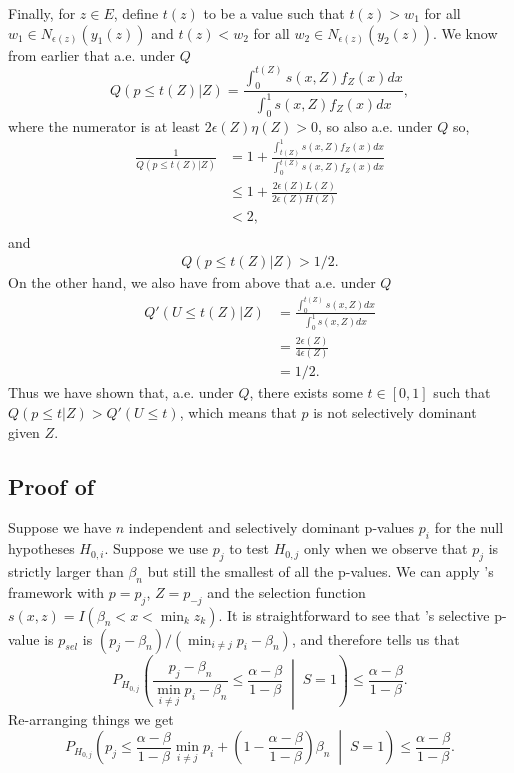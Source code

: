 \documentclass{article}
\begin{document}
\begin{appendix}
Finally, for $z \in E$, define $t(z)$ to be a value such that $t(z) > w_1$ for all $w_1 \in N_{\epsilon(z)}(y_1(z))$ and $t(z) < w_2$ for all $w_2 \in  N_{\epsilon(z)}(y_2(z))$. We know from earlier that a.e. under $Q$ 
\begin{equation*}
    Q(p \leq t(Z) |Z) = \frac{\int_0^{t(Z)} s(x, Z) f_Z(x) dx }{\int_0^1 s(x, Z) f_Z(x) dx},
\end{equation*}
where the numerator is at least $2\epsilon(Z)\eta(Z) >0$, so also a.e. under $Q$
so, 
\begin{align*}
    \frac{1}{Q(p \leq t(Z) |Z)} &= 1 + \frac{\int_{t(Z)}^1 s(x, Z) f_Z(x) dx }{\int_0^{t(Z)} s(x, Z) f_Z(x) dx}\\
                                &\leq 1 + \frac{2 \epsilon(Z) L(Z)}{2 \epsilon(Z)H(Z)}\\
                                &< 2, \\
\end{align*}
and 
\begin{align*}
    Q(p \leq t(Z) |Z) > 1/2.
\end{align*}
On the other hand, we also have from above that a.e. under $Q$ 
\begin{align*}
    Q'(U \leq t(Z) |Z) &= \frac{\int_0^{t(Z)} s(x, Z) dx }{\int_0^1 s(x, Z) dx}\\
                       &= \frac{2\epsilon(Z)}{4 \epsilon(Z)}\\
                       &= 1/2.
\end{align*}
Thus we have shown that, a.e. under $Q$, there exists some $t \in [0, 1]$ such that $Q(p \leq t | Z) > Q'(U \leq t)$, which means that $p$ is not selectively dominant given $Z$.  


\subsection{Proof of }
\label{sec:hyb_proof_appdx}

Suppose we have $n$ independent and selectively dominant p-values $p_i$ for the null hypotheses $H_{0, i}$. Suppose we use $p_j$ to test $H_{0, j}$ only when we observe that $p_j$ is strictly larger than $\beta_n$ but still the smallest of all the p-values. We can apply 's framework with $p=p_j$, $Z = p_{-j}$ and the selection function $s(x, z) = I(\beta_n < x < \min_{k} z_k)$. It is straightforward to see that 's selective p-value is $p_{sel}$ is $(p_j - \beta_n)/(\min_{i \neq j} p_i - \beta_n)$, and  therefore tells us that 
\begin{equation*}
    P_{H_{0, j}}\left( \frac{p_j - \beta_n}{\min_{i \neq j} p_i - \beta_n} \leq \frac{\alpha -\beta}{1-\beta}  \;\middle|\;  S=1 \right) \leq \frac{\alpha - \beta}{1-\beta}.
\end{equation*}
Re-arranging things we get 
\begin{equation}
    \label{eq:hybrid_tool}
    P_{H_{0, j}}\left( p_j  \leq \frac{\alpha -\beta}{1-\beta}\min_{i \neq j} p_i  + \left( 1 - \frac{\alpha -\beta}{1-\beta}\right) \beta_n  \;\middle|\; S=1  \right) \leq \frac{\alpha - \beta}{1-\beta}.
\end{equation}



\end{appendix}
\end{document}
